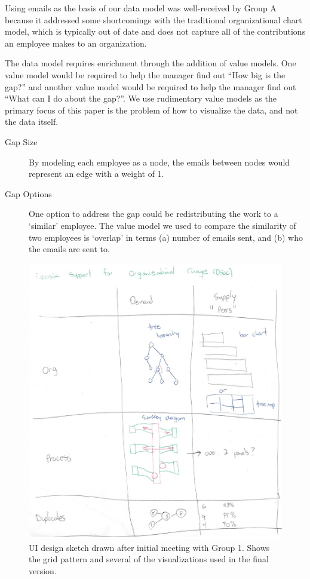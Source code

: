 \documentclass[journal]{vgtc}                %
\begin{document}
Using emails as the basis of our data model was well-received by Group A because it addressed some shortcomings with the traditional organizational chart model, which is typically out of date and does not capture all of the contributions an employee makes to an organization.

The data model requires enrichment through the addition of value models.  One value model would be required to help the manager find out ``How big is the gap?'' and another value model would be required to help the manager find out ``What can I do about the gap?''.  We use rudimentary value models as the primary focus of this paper is the problem of how to visualize the data, and not the data itself.

\begin{description}
\item [Gap Size] By modeling each employee as a node, the emails between nodes would represent an edge with a weight of 1.
\item [Gap Options] One option to address the gap could be redistributing the work to a \lq similar\rq{} employee. The value model we used to compare the similarity of two employees is \lq overlap\rq{} in terms (a) number of emails sent, and (b) who the emails are sent to.
\end{description}

\begin{figure}
  \centering
  \includegraphics[width=\columnwidth]{pictures/Sketch.jpg}
  \caption{UI design sketch drawn after initial meeting with Group 1. Shows the grid pattern and several of the visualizations used in the final version.}
  \label{fig:sketch}
\end{figure}
\end{document}
